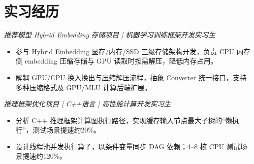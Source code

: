
\section{实习经历}
\textit{推荐模型 Hybrid Embedding 存储项目 | 机器学习训练框架开发实习生}
\begin{itemize}
  \item 参与 Hybrid Embedding 显存/内存/SSD 三级存储架构开发，负责 CPU 内存侧 embedding 压缩存储与 GPU 读取时按需解压，降低内存占用。
  \item 解耦 GPU/CPU 换入换出与压缩解压流程，抽象 Converter 统一接口，支持多种压缩格式及 GPU/MLU 计算后端扩展。
\end{itemize}
\textit{推理框架优化项目 | C++语言 | 高性能计算开发实习生}
\begin{itemize}
  \item 分析 C++ 推理框架计算图执行路径，实现缓存输入节点最大子树的“懒执行”，测试场景提速约20\%。
  \item 设计线程池并发执行算子，以条件变量同步 DAG 依赖；4--8 核 CPU 测试场景提速约120\%。
\end{itemize}
